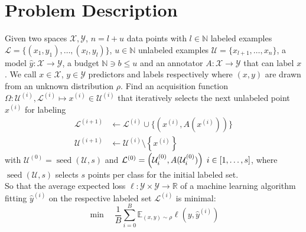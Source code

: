 \documentclass[]{article}
\newcommand{\X}{\mathcal{X}}
\newcommand{\Y}{\mathcal{Y}}
\newcommand{\U}{\mathcal{U}}
\newcommand{\LL}{\mathcal{L}}
\begin{document}
\section{Problem Description}
Given two spaces $\X, \Y$, $n=l+u$ data points with $l \in \mathbb{N}$ labeled examples $\mathcal{L} = \{(x_1, y_1),\ldots, (x_l,y_l)\}$, $u \in \mathbb{N}$ unlabeled examples $\mathcal{U} = \{x_{l+1},\ldots,x_{n}\}$, a model $\hat y: \X \to \Y$, a budget $\mathbb{N} \ni b \le u$ and an annotator $A: \mathcal{X} \to \mathcal{Y}$ that can label $x$. %
We call $x \in \mathcal{X}$, $y \in \mathcal{Y}$ predictors and labels respectively where $(x,y)$ are drawn from an unknown distribution $\rho$. 
Find an acquisition function $\Omega: \U^{(i)},\LL^{(i)} \mapsto x^{(i)} \in \U^{(i)}$ that iteratively selects the next unlabeled point $x^{(i)}$ for labeling
\begin{align*}
	\LL^{(i+1)} &\gets \LL^{(i)} \cup \{\left(x^{(i)}, A(x^{(i)})\right)\} \\
	\U^{(i+1)} &\gets \U^{(i)} \setminus \left\{x^{(i)}\right\} %
\end{align*}
with $\U^{(0)} = \operatorname{seed}(\U, s)$ and $\LL^{(0)} = \left(\U^{(0)}_i, A(\U^{(0)}_i)\right) \hspace{1mm} i \in [1, \ldots, s]$, where $\operatorname{seed}(\U, s)$ selects $s$ points per class for the initial labeled set. \\
So that the average expected loss $\ell: \mathcal{Y} \times \mathcal{Y} \to \mathbb{R}$ of a machine learning algorithm fitting $\hat y^{(i)}$ on the respective labeled set $\LL^{(i)}$ is minimal: 
$$\min \quad \frac{1}{B} \sum\limits_{i=0}^B \mathbb{E}_{(x,y) \sim \rho} \ell(y, \hat y^{(i)})$$

\end{document}
